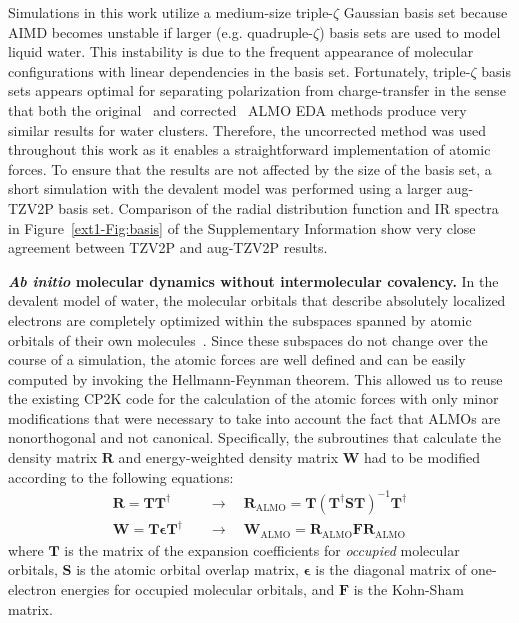 \documentclass[journal=jacsat,manuscript=article]{achemso}
\begin{document}
Simulations in this work utilize a medium-size triple-$\zeta$ Gaussian basis set because AIMD becomes unstable if larger (e.g. quadruple-$\zeta$) basis sets are used to model liquid water. 
This instability is due to the frequent appearance of molecular configurations with linear dependencies in the basis set. 
Fortunately, triple-$\zeta$ basis sets appears optimal for separating polarization from charge-transfer in the sense that both the original~\cite{khaliullin2007unravelling} and corrected~\cite{horn2015polarization} ALMO EDA methods produce very similar results for water clusters. 
Therefore, the uncorrected method was used throughout this work as it enables a straightforward implementation of atomic forces. 
To ensure that the results are not affected by the size of the basis set, a short simulation with the devalent model was performed using a larger aug-TZV2P basis set. Comparison of the radial distribution function and IR spectra in Figure~\ref{ext1-Fig:basis} of the Supplementary Information show very close agreement between TZV2P and aug-TZV2P results. 


\textbf{\textit{Ab initio} molecular dynamics without intermolecular covalency.} In the devalent model of water, the molecular orbitals that describe absolutely localized electrons are completely optimized within the subspaces spanned by atomic orbitals of their own molecules~\cite{khaliullin2006efficient}. Since these subspaces do not change over the course of a simulation, the atomic forces are well defined and can be easily computed by invoking the Hellmann-Feynman theorem. This allowed us to reuse the existing CP2K code for the calculation of the atomic forces with only minor modifications that were necessary to take into account the fact that ALMOs are nonorthogonal and not canonical. Specifically, the subroutines that calculate the density matrix $\mathbf{R}$ and  energy-weighted density matrix $\mathbf{W}$ had to be modified according to the following equations:
%
\begin{equation}
\begin{split}
\mathbf{R} = \mathbf{T} \mathbf{T}^{\dagger} \quad &\rightarrow \quad \mathbf{R}_{\text{ALMO}} = \mathbf{T} (\mathbf{T}^{\dagger} \mathbf{S} \mathbf{T})^{-1}\mathbf{T}^{\dagger} \\
\mathbf{W} = \mathbf{T} \mathbf{\epsilon} \mathbf{T}^{\dagger} \quad &\rightarrow \quad \mathbf{W}_{\text{ALMO}}  = \mathbf{R}_{\text{ALMO}} \mathbf{F} \mathbf{R}_{\text{ALMO}}
\end{split}
\end{equation}
%
where $\mathbf{T}$ is the matrix of the expansion coefficients for \emph{occupied} molecular orbitals, $\mathbf{S}$ is the atomic orbital overlap matrix, $\mathbf{\epsilon}$ is the diagonal matrix of one-electron energies for occupied molecular orbitals, and $\mathbf{F}$ is the Kohn-Sham matrix.
\end{document}
